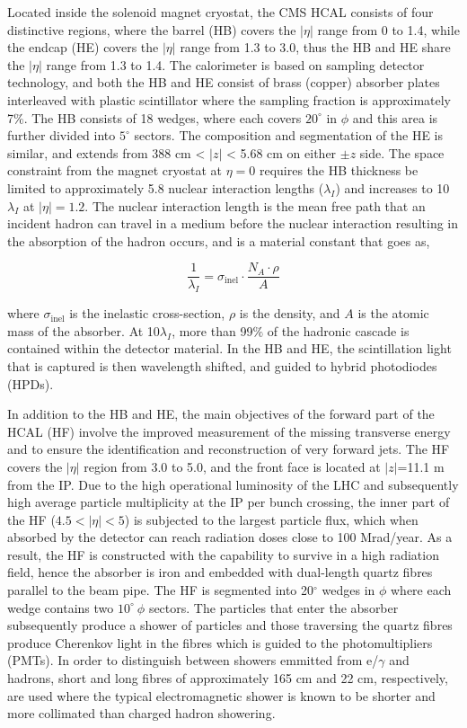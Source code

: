 Located inside the solenoid magnet cryostat, the CMS HCAL consists of four distinctive regions, where the barrel (HB) covers the $|\eta|$ range from 0 to 1.4, while the endcap (HE) covers the $|\eta|$ range from 1.3 to 3.0, thus the HB and HE share the $|\eta|$ range from 1.3 to 1.4. The calorimeter is based on sampling detector technology, and both the HB and HE consist of brass (copper) absorber plates interleaved with plastic scintillator where the sampling fraction is approximately 7$\%$. The HB consists of 18 wedges, where each covers $20^\circ$ in $\phi$ and this area is further divided into $5^\circ$ sectors. The composition and segmentation of the HE is similar, and extends from 388 cm < $|z|$ < 5.68 cm on either $\pm z$ side. The space constraint from the magnet cryostat at $\eta=0$ requires the HB thickness be limited to approximately 5.8 nuclear interaction lengths ($\lambda_{I}$) and increases to 10$\lambda_{I}$ at $|\eta|=1.2$. The nuclear interaction length is the mean free path that an incident hadron can travel in a medium before the nuclear interaction resulting in the absorption of the hadron occurs, and is a material constant that goes as, 

\begin{equation}
  \frac{1}{\lambda_{I}} = \sigma_{\textrm{inel}}\cdot\frac{N_A\cdot\rho}{A}
\end{equation}

where $\sigma_{\textrm{inel}}$ is the inelastic cross-section, $\rho$ is the density, and $A$ is the atomic mass of the absorber. At 10$\lambda_{I}$, more than 99$\%$ of the hadronic cascade is contained within the detector material. In the HB and HE, the scintillation light that is captured is then wavelength shifted, and guided to hybrid photodiodes (HPDs).

In addition to the HB and HE, the main objectives of the forward part of the HCAL (HF) involve the improved measurement of the missing transverse energy and to ensure the identification and reconstruction of very forward jets. The HF covers the $|\eta|$ region from 3.0 to 5.0, and the front face is located at $|z|$=11.1 m from the IP. Due to the high operational luminosity of the LHC and subsequently high average particle multiplicity at the IP per bunch crossing, the inner part of the HF ($4.5 < |\eta| < 5$) is subjected to the largest particle flux, which when absorbed by the detector can reach radiation doses close to 100 Mrad/year. As a result, the HF is constructed with the capability to survive in a high radiation field, hence the absorber is iron and embedded with dual-length quartz fibres parallel to the beam pipe. The HF is segmented into 20$^\circ$ wedges in $\phi$ where each wedge contains two $10^\circ\:\phi$ sectors. The particles that enter the absorber subsequently produce a shower of particles and those traversing the quartz fibres produce Cherenkov light in the fibres which is guided to the photomultipliers (PMTs). In order to distinguish between showers emmitted from e/$\gamma$ and hadrons, short and long fibres of approximately 165 cm and 22 cm, respectively, are used where the typical electromagnetic shower is known to be shorter and more collimated than charged hadron showering.

